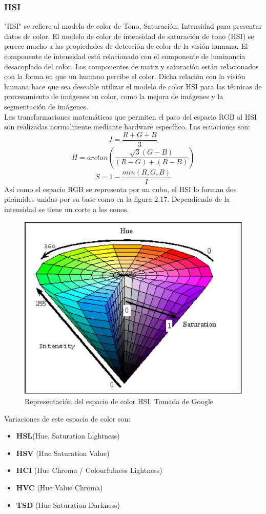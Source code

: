 \subsubsection{HSI}
"HSI" se refiere al modelo de color de Tono, Saturación, Intensidad para presentar datos
de color. El modelo de color de intensidad de saturación de tono (HSI) se parece mucho
a las propiedades de detección de color de la visión humana. El componente de intensidad
está relacionado con el componente de luminancia desacoplado del color. Los componentes
de matiz y saturación están relacionados con la forma en que un humano percibe el color.
Dicha relación con la visión humana hace que sea deseable utilizar el modelo de color
HSI para las técnicas de procesamiento de imágenes en color, como la mejora de imágenes
y la segmentación de imágenes.\cite{Article:taiy2000}\\
Las transformaciones matemáticas que permiten el paso del espacio RGB al HSI
son realizadas normalmente mediante hardware específico. Las ecuaciones son:
\begin{equation}
	I=\frac{R+G+B}{3}
\end{equation}
\begin{equation}
	H = arctan \left( \frac{\sqrt{3}(G-B)}{(R-G)+(R-B)} \right)
\end{equation}
\begin{equation}
	S = 1 - \frac{min(R,G,B)}{I}
\end{equation}
Así como el espacio RGB se representa por un cubo, el HSI lo forman dos
pirámides unidas por su base como en la figura 2.17. Dependiendo de la intensidad se tiene un corte a los
conos.
\begin{figure}[h]
	\begin{center}
		\includegraphics[width=0.55 \textwidth]{Contenido/Cuerpo/Capitulo2/Fig11.eps}
		\caption{Representación del espacio de color HSI. Tomada de Google}
		\label{fig:20}
	\end{center}
\end{figure}
Variaciones de este espacio de color son:
\begin{itemize}
	\item \textbf{HSL}(Hue, Saturation Lightness)
	\item \textbf{HSV} (Hue Saturation Value)
	\item \textbf{HCI} (Hue Chroma / Colourfulness Lightness)
	\item \textbf{HVC} (Hue Value Chroma)
	\item \textbf{TSD} (Hue Saturation Darkness)
\end{itemize}

